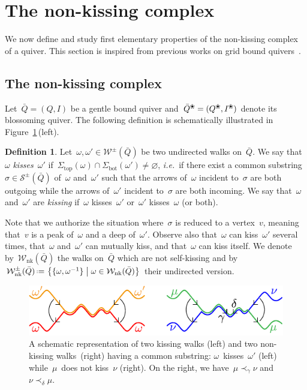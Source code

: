 \documentclass{amsart}
\theoremstyle{definition}
\newtheorem{definition}[theorem]{Definition}
\newcommand{\set}[2]{\left\{ #1 \;\middle|\; #2 \right\}} %
\newcommand{\eqdef}{\mbox{\,\raisebox{0.2ex}{\scriptsize\ensuremath{\mathrm:}}\ensuremath{=}\,}} %
\newcommand{\fref}[1]{Figure~\ref{#1}} %
\newcommand{\ie}{\textit{i.e.}~} %
\newcommand{\darkblue}{\color{darkblue}} %
\newcommand{\defn}[1]{\textsl{\darkblue #1}} %
\newcommand{\blossom}{^\text{\ding{96}}} %
\newcommand{\strings}{\mathcal{S}} %
\newcommand{\walks}{\mathcal{W}} %
\newcommand{\NKWalks}{\mathcal{W}_\mathrm{nk}} %
\renewcommand{\top}{\mathrm{top}} %
\newcommand{\bottom}{\mathrm{bot}} %
\begin{document}

\section{The non-kissing complex}
\label{sec:nonKissingComplex}

\enlargethispage{.2cm}
We now define and study first elementary properties of the non-kissing complex of a quiver.
This section is inspired from previous works on grid bound quivers~\cite{PetersenPylyavskyySpeyer, SantosStumpWelker, McConville, GarverMcConville}.

\subsection{The non-kissing complex}

Let~$\bar Q = (Q,I)$ be a gentle bound quiver and~$\bar Q\blossom = (Q\blossom,I\blossom)$ denote its blossoming quiver.
The following definition is schematically illustrated in \fref{fig:kissingCrossing}\,(left).

\begin{definition}\label{def: kissing}
Let~$\omega,\omega' \in \walks^\pm(\bar Q)$ be two undirected walks on~$\bar Q$.
We say that~$\omega$ \defn{kisses}~$\omega'$ if~$\Sigma_\top(\omega) \cap \Sigma_\bottom(\omega') \ne \varnothing$, \ie if there exist a common substring~$\sigma \in \strings^\pm(\bar Q)$ of~$\omega$ and~$\omega'$ such that the arrows of~$\omega$ incident to~$\sigma$ are both outgoing while the arrows of~$\omega'$ incident to~$\sigma$ are both incoming.
We say that~$\omega$ and~$\omega'$ are \defn{kissing} if~$\omega$ kisses~$\omega'$ or~$\omega'$ kisses~$\omega$ (or both).
\end{definition}

Note that we authorize the situation where~$\sigma$ is reduced to a vertex~$v$, meaning that~$v$ is a peak of~$\omega$ and a deep of~$\omega'$.
Observe also that~$\omega$ can kiss~$\omega'$ several times, that~$\omega$ and~$\omega'$ can mutually kiss, and that~$\omega$ can kiss itself.
We denote by~$\NKWalks(\bar Q)$ the walks on~$\bar Q$ which are not self-kissing and by~$\NKWalks^\pm(\bar Q) \eqdef \set{\{\omega, \omega^{-1}\}}{\omega \in \NKWalks(\bar Q)}$ their undirected version.

\begin{figure}[b]
	\capstart
	\centerline{\includegraphics[scale=1]{kissingCrossing}}
	\caption{A schematic representation of two kissing walks (left) and two non-kissing walks~(right) having a common substring: $\omega$~kisses~$\omega'$ (left) while~$\mu$~does not kiss~$\nu$ (right). On the right, we have~$\mu \prec_\gamma \nu$ and~$\nu \prec_\delta \mu$.}
	\label{fig:kissingCrossing}
\end{figure}
\end{document}
